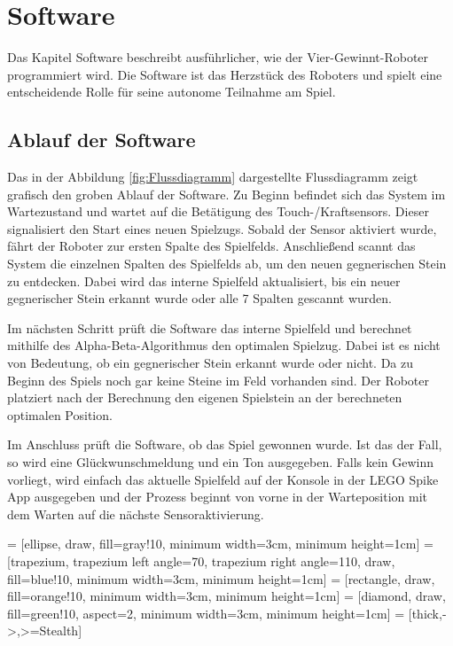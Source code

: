 \section{Software}
Das Kapitel Software beschreibt ausführlicher, wie der Vier-Gewinnt-Roboter programmiert wird. Die Software ist das Herzstück des Roboters und spielt eine entscheidende Rolle für seine autonome Teilnahme am Spiel.

\subsection{Ablauf der Software}
Das in der Abbildung \ref{fig:Flussdiagramm} dargestellte Flussdiagramm zeigt grafisch den groben Ablauf der Software. \newline
Zu Beginn befindet sich das System im Wartezustand und wartet auf die Betätigung des Touch-/Kraftsensors. Dieser signalisiert den Start eines neuen Spielzugs. Sobald der Sensor aktiviert wurde, fährt der Roboter zur ersten Spalte des Spielfelds.
Anschließend scannt das System die einzelnen Spalten des Spielfelds ab, um den neuen gegnerischen Stein zu entdecken. Dabei wird das interne Spielfeld aktualisiert, bis ein neuer gegnerischer Stein erkannt wurde oder alle 7 Spalten gescannt wurden.

Im nächsten Schritt prüft die Software das interne Spielfeld und berechnet mithilfe des Alpha-Beta-Algorithmus den optimalen Spielzug.
Dabei ist es nicht von Bedeutung, ob ein gegnerischer Stein erkannt wurde oder nicht. Da zu Beginn des Spiels noch gar keine Steine im Feld vorhanden sind.
Der Roboter platziert nach der Berechnung den eigenen Spielstein an der berechneten optimalen Position.

Im Anschluss prüft die Software, ob das Spiel gewonnen wurde. Ist das der Fall, so wird eine Glückwunschmeldung und ein Ton ausgegeben. Falls kein Gewinn vorliegt, wird einfach das aktuelle Spielfeld auf der Konsole in der LEGO Spike App ausgegeben und der Prozess beginnt von vorne in der Warteposition mit dem Warten auf die nächste Sensoraktivierung. 




 = [ellipse, draw, fill=gray!10, minimum width=3cm, minimum height=1cm]
 = [trapezium, trapezium left angle=70, trapezium right angle=110, draw, fill=blue!10, minimum width=3cm, minimum height=1cm]
 = [rectangle, draw, fill=orange!10, minimum width=3cm, minimum height=1cm]
 = [diamond, draw, fill=green!10, aspect=2, minimum width=3cm, minimum height=1cm]
 = [thick,->,>=Stealth]

